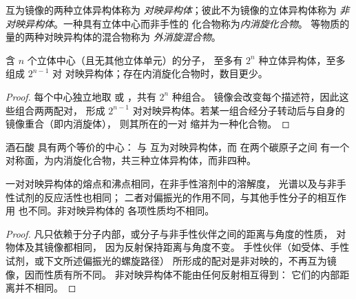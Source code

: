 \begin{definition}\label{def:b1:stereochemistry-in-depth:enantiomers}
互为镜像的两种立体异构体称为
\emph{对映异构体}；彼此不为镜像的立体异构体称为
\emph{非对映异构体}。一种具有立体中心而非手性的
化合物称为\emph{内消旋化合物}。
等物质的量的两种对映异构体的混合物称为
\emph{外消旋混合物}。
\end{definition}

\begin{proposition}[立体异构体的数目]\label{prop:b1:stereochemistry-in-depth:max-stereoisomers}
含 $n$ 个立体中心（且无其他立体单元）的分子，
至多有 $2^n$ 种立体异构体，至多组成 $2^{n-1}$ 对
对映异构体；存在内消旋化合物时，数目更少。
\end{proposition}

\begin{proof}
每个中心独立地取  或 ，共有 $2^n$ 种组合。
镜像会改变每个描述符，因此这些组合两两配对，
形成 $2^{n-1}$ 对对映异构体。若某一组合经分子转动后与自身的镜像重合（即内消旋体），
则其所在的一对
缩并为一种化合物。
\end{proof}

酒石酸  具有两个等价的中心：
 与  互为对映异构体，而  在两个碳原子之间
有一个对称面，为内消旋化合物，共三种立体异构体，而非四种。

\begin{proposition}[对映异构体的性质]\label{prop:b1:stereochemistry-in-depth:enantiomer-properties}
一对对映异构体的熔点和沸点相同，在非手性溶剂中的溶解度，
光谱以及与非手性试剂的反应活性也相同；
二者对偏振光的作用不同，与其他手性分子的相互作用
也不同。非对映异构体的
各项性质均不相同。
\end{proposition}

\begin{proof}
凡只依赖于分子内部，或分子与非手性伙伴之间的距离与角度的性质，
对物体及其镜像都相同，
因为反射保持距离与角度不变。
手性伙伴（如受体、手性试剂，或下文所述偏振光的螺旋路径）
所形成的配对是非对映的，不再互为镜像，因而性质有所不同。
非对映异构体不能由任何反射相互得到：
它们的内部距离并不相同。
\end{proof}


